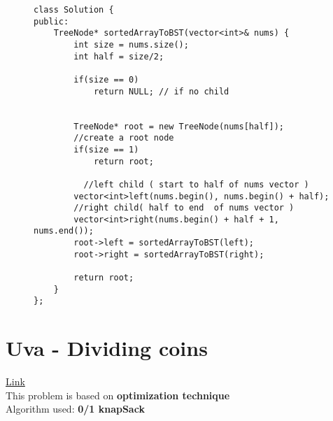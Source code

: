 \documentclass{article}
\begin{document}
\begin{figure}[H]
\begin{lstlisting}[style=cppStyle]
class Solution {
public:
    TreeNode* sortedArrayToBST(vector<int>& nums) {
        int size = nums.size();
        int half = size/2;
        
        if(size == 0)
            return NULL; // if no child

        
        TreeNode* root = new TreeNode(nums[half]);
        //create a root node 
        if(size == 1)
            return root;

          //left child ( start to half of nums vector )  
        vector<int>left(nums.begin(), nums.begin() + half);
        //right child( half to end  of nums vector )
        vector<int>right(nums.begin() + half + 1, nums.end());
        root->left = sortedArrayToBST(left);
        root->right = sortedArrayToBST(right);
        
        return root;
    }
};
\end{lstlisting}
\end{figure}



\section{Uva - Dividing coins } \href{https://onlinejudge.org/index.php?option=com_onlinejudge&Itemid=8&page=show_problem&problem=503}{Link} \\

This problem is based on  \textbf{ optimization technique }\\
Algorithm used: \textbf{0/1 knapSack}\\
\\
\\
\\
\\
\\
\end{document}

